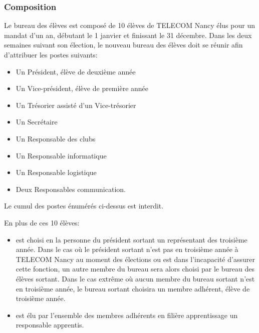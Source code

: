 \documentclass{article}
\begin{document}
			\subsubsection{Composition}
				Le bureau des élèves est composé de 10 élèves de TELECOM Nancy
				élus pour un mandat d’un an, débutant le 1 janvier et
				finissant le 31 décembre. Dans les deux semaines suivant son
				élection, le nouveau bureau des élèves doit se réunir afin
				d'attribuer les postes suivants:
				\begin{itemize}
					\item Un Président, élève de deuxième année
					\item Un Vice-président, élève de première année
					\item Un Trésorier assisté d’un Vice-trésorier
					\item Un Secrétaire
					\item Un Responsable des clubs
					\item Un Responsable informatique
					\item Un Responsable logistique
					\item Deux Responsables communication.
				\end{itemize}

				Le cumul des postes énumérés ci-dessus est interdit.

				En plus de ces 10 élèves:
				\begin{itemize}
					\item est choisi en la personne du président sortant un
						représentant des troisième année. Dans le cas où le
						président sortant n’est pas en troisième année à TELECOM
						Nancy au moment des élections ou est dans l'incapacité
						d'assurer cette fonction, un autre membre du bureau sera
						alors choisi par le bureau des élèves sortant. Dans le
						cas extrême où aucun membre du bureau sortant n’est en
						troisième année, le bureau sortant choisira un membre
						adhérent, élève de troisième année.
					\item est élu par l’ensemble des membres adhérents en
						filière apprentissage un responsable apprentis.
				\end{itemize}
\end{document}
